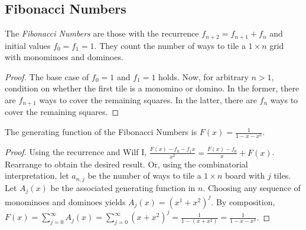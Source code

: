 \documentclass[a4paper]{article}
\begin{document}
\subsection{Fibonacci Numbers}

\begin{definition}
The \emph{Fibonacci Numbers} are those with the recurrence $f_{n+2}=f_{n+1}+f_n$ and initial values $f_0=f_1=1$. They count the number of ways to tile a $1\times n$ grid with monominoes and dominoes.

\begin{hl}
\begin{proof}
The base case of $f_0=1$ and $f_1=1$ holds. Now, for arbitrary $n>1$, condition on whether the first tile is a monomino or domino. In the former, there are $f_{n+1}$ ways to cover the remaining squares. In the latter, there are $f_n$ ways to cover the remaining squares.
\end{proof}
\end{hl}
\end{definition}

\begin{lemma}
The generating function of the Fibonacci Numbers is $\displaystyle F(x)=\frac1{1-x-x^2}$.

\begin{hl}
\begin{proof}
Using the recurrence and Wilf I, $\frac{F(x)-f_0-f_1x}{x^2}=\frac{F(x)-f_0}x+F(x)$. Rearrange to obtain the desired result. Or, using the combinatorial interpretation, let $a_{n,j}$ be the number of ways to tile a $1\times n$ board with $j$ tiles. Let $A_j(x)$ be the associated generating function in $n$. Choosing any sequence of monominoes and dominoes yields $A_j(x)=(x^1+x^2)^j$. By composition, $F(x)=\sum_{j=0}^\infty A_j(x)=\sum_{j=0}^\infty(x+x^2)^j=\frac1{1-(x+x^2)}=\frac1{1-x-x^2}$.
\end{proof}
\end{hl}
\end{lemma}
\end{document}
